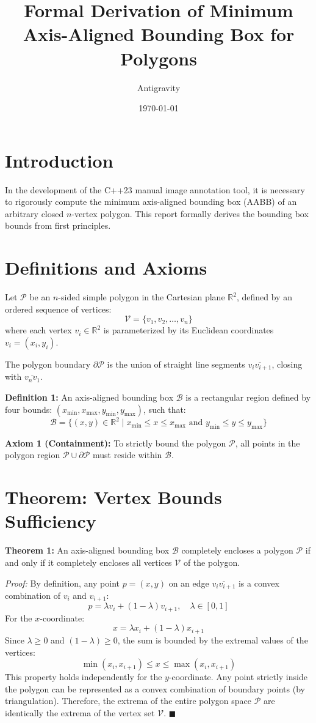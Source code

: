 \documentclass{article}
\title{Formal Derivation of Minimum Axis-Aligned Bounding Box for Polygons}
\author{Antigravity}
\date{\today}
\begin{document}
\maketitle

\section*{Introduction}
In the development of the C++23 manual image annotation tool, it is necessary to rigorously compute the minimum axis-aligned bounding box (AABB) of an arbitrary closed $n$-vertex polygon. This report formally derives the bounding box bounds from first principles.

\section*{Definitions and Axioms}

Let $\mathcal{P}$ be an $n$-sided simple polygon in the Cartesian plane $\mathbb{R}^2$, defined by an ordered sequence of vertices:
\[
\mathcal{V} = \{v_1, v_2, \dots, v_n\}
\]
where each vertex $v_i \in \mathbb{R}^2$ is parameterized by its Euclidean coordinates $v_i = (x_i, y_i)$.

The polygon boundary $\partial\mathcal{P}$ is the union of straight line segments $\overline{v_i v_{i+1}}$, closing with $\overline{v_n v_1}$.

\textbf{Definition 1:} An axis-aligned bounding box $\mathcal{B}$ is a rectangular region defined by four bounds: $(x_{\min}, x_{\max}, y_{\min}, y_{\max})$, such that:
\[
\mathcal{B} = \{ (x, y) \in \mathbb{R}^2 \mid x_{\min} \le x \le x_{\max} \text{ and } y_{\min} \le y \le y_{\max} \}
\]

\textbf{Axiom 1 (Containment):} To strictly bound the polygon $\mathcal{P}$, all points in the polygon region $\mathcal{P} \cup \partial\mathcal{P}$ must reside within $\mathcal{B}$.

\section*{Theorem: Vertex Bounds Sufficiency}
\textbf{Theorem 1:} An axis-aligned bounding box $\mathcal{B}$ completely encloses a polygon $\mathcal{P}$ if and only if it completely encloses all vertices $\mathcal{V}$ of the polygon.

\textit{Proof:} 
By definition, any point $p = (x,y)$ on an edge $\overline{v_i v_{i+1}}$ is a convex combination of $v_i$ and $v_{i+1}$:
\[
p = \lambda v_i + (1-\lambda) v_{i+1}, \quad \lambda \in [0, 1]
\]
For the $x$-coordinate:
\[
x = \lambda x_i + (1-\lambda) x_{i+1}
\]
Since $\lambda \ge 0$ and $(1-\lambda) \ge 0$, the sum is bounded by the extremal values of the vertices:
\[
\min(x_i, x_{i+1}) \le x \le \max(x_i, x_{i+1})
\]
This property holds independently for the $y$-coordinate. Any point strictly inside the polygon can be represented as a convex combination of boundary points (by triangulation). Therefore, the extrema of the entire polygon space $\mathcal{P}$ are identically the extrema of the vertex set $\mathcal{V}$. $\blacksquare$
\end{document}
